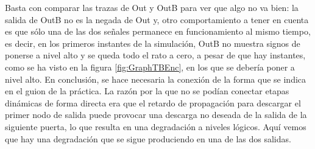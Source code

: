 Basta con comparar las trazas de Out y OutB para ver que algo no va bien: la salida de OutB no es la negada de Out y, otro comportamiento a tener en cuenta es que sólo una de las dos señales permanece en funcionamiento al mismo tiempo, es decir, en los primeros instantes de la simulación, OutB no muestra signos de ponerse a nivel alto y se queda todo el rato a cero, a pesar de que hay instantes, como se ha visto en la figura \ref{fig:GraphTBEnc}, en los que se debería poner a nivel alto. En conclusión, se hace necesaria la conexión de la forma que se indica en el guion de la práctica. La razón por la que no se podían conectar etapas dinámicas de forma directa era que el retardo de propagación para descargar el primer nodo de salida puede provocar una descarga no deseada de la salida de la siguiente puerta, lo que resulta en una degradación a niveles lógicos. Aquí vemos que hay una degradación que se sigue produciendo en una de las dos salidas.

\restoregeometry

